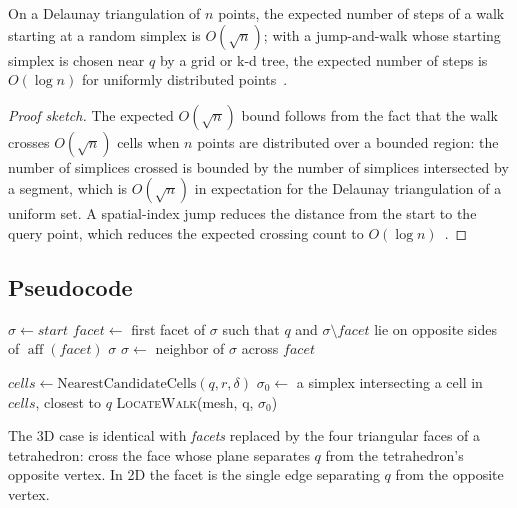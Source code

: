 \begin{theorem}\label{thm:walk_length}
On a Delaunay triangulation of $n$ points, the expected number of steps of a
walk starting at a random simplex is $O(\sqrt{n})$; with a jump-and-walk whose
starting simplex is chosen near $q$ by a grid or k-d tree, the expected number
of steps is $O(\log n)$ for uniformly distributed points~\cite{devillers2002}.
\end{theorem}
\begin{proof}[Proof sketch]
The expected $O(\sqrt{n})$ bound follows from the fact that the walk crosses
$O(\sqrt{n})$ cells when $n$ points are distributed over a bounded region: the
number of simplices crossed is bounded by the number of simplices intersected
by a segment, which is $O(\sqrt{n})$ in expectation for the Delaunay
triangulation of a uniform set. A spatial-index jump reduces the distance from
the start to the query point, which reduces the expected crossing count to
$O(\log n)$~\cite{devillers2002}.
\end{proof}

\subsection{Pseudocode}

\begin{algorithm}[htbp]
\caption{Locate in a Triangulation by Visibility Walk}
\label{alg:walk_locate}
\begin{algorithmic}[1]
  \State $\sigma \gets start$
    \State $facet \gets$ first facet of $\sigma$ such that $q$ and $\sigma \setminus facet$ lie on opposite sides of $\operatorname{aff}(facet)$
     
      \State \Return $\sigma$
    \EndIf
    \State $\sigma \gets$ neighbor of $\sigma$ across $facet$ 
  \EndWhile
\EndFunction

\Statex

  \State $cells \gets \text{NearestCandidateCells}(q, r, \delta)$ 
  \State $\sigma_0 \gets$ a simplex intersecting a cell in $cells$, closest to $q$
  \State \Return \textsc{LocateWalk}(mesh, q, $\sigma_0$)
\EndFunction
\end{algorithmic}
\end{algorithm}

The 3D case is identical with \emph{facets} replaced by the four triangular
faces of a tetrahedron: cross the face whose plane separates $q$ from the
tetrahedron's opposite vertex. In 2D the facet is the single edge separating
$q$ from the opposite vertex.

